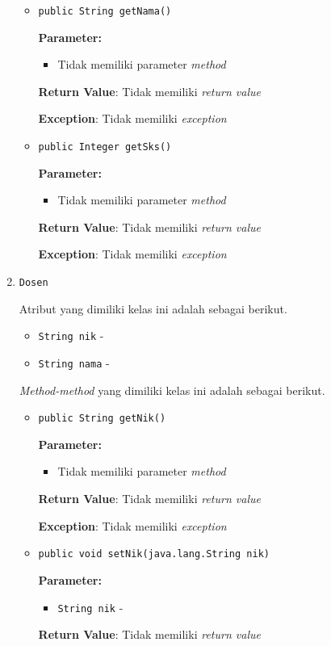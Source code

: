 \documentclass{article}
\begin{document}
\begin{enumerate}
\begin{itemize}
\item \texttt{public String getNama()}



\textbf{Parameter:}
\begin{itemize}
\item Tidak memiliki parameter \textit{method}
\end{itemize}
\textbf{Return Value}: Tidak memiliki \textit{return value}

\textbf{Exception}: Tidak memiliki \textit{exception}

\item \texttt{public Integer getSks()}



\textbf{Parameter:}
\begin{itemize}
\item Tidak memiliki parameter \textit{method}
\end{itemize}
\textbf{Return Value}: Tidak memiliki \textit{return value}

\textbf{Exception}: Tidak memiliki \textit{exception}

\end{itemize}
\item \texttt{Dosen}



Atribut yang dimiliki kelas ini adalah sebagai berikut.
\begin{itemize}
\item \texttt{String nik} - 
\item \texttt{String nama} - 
\end{itemize}
\textit{Method-method} yang dimiliki kelas ini adalah sebagai berikut.
\begin{itemize}
\item \texttt{public String getNik()}



\textbf{Parameter:}
\begin{itemize}
\item Tidak memiliki parameter \textit{method}
\end{itemize}
\textbf{Return Value}: Tidak memiliki \textit{return value}

\textbf{Exception}: Tidak memiliki \textit{exception}

\item \texttt{public void setNik(java.lang.String nik)}



\textbf{Parameter:}
\begin{itemize}
\item \texttt{String nik} - 
\end{itemize}
\textbf{Return Value}: Tidak memiliki \textit{return value}


\end{itemize}
\end{enumerate}
\end{document}
